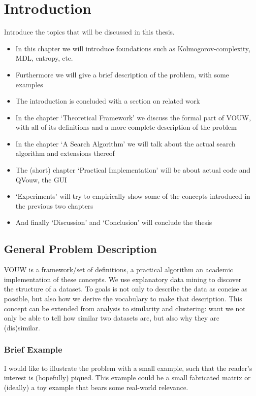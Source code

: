 \documentclass[a4paper,notoc,oneside]{tufte-book}
\begin{document}
\chapter{Introduction}

Introduce the topics that will be discussed in this thesis.
\begin{itemize}
\item In this chapter we will introduce foundations such as Kolmogorov-complexity, MDL, entropy, etc.
\item Furthermore we will give a brief description of the problem, with some examples
\item The introduction is concluded with a section on related work
\item In the chapter `Theoretical Framework' we discuss the formal part of VOUW, with all of its definitions and a more complete description of the problem
\item In the chapter `A Search Algorithm' we will talk about the actual search algorithm and extensions thereof 
\item The (short) chapter `Practical Implementation' will be about actual code and QVouw, the GUI
\item `Experiments' will try to empirically show some of the concepts introduced in the previous two chapters
\item And finally `Discussion' and `Conclusion' will conclude the thesis
\end{itemize}

\section{General Problem Description}

VOUW is a framework/set of definitions, a practical algorithm an academic implementation of these concepts. We use explanatory data mining to discover the structure of a dataset. To goals is not only to describe the data as concise as possible, but also how we derive the vocabulary to make that description. This concept can be extended from analysis to similarity and clustering: want we not only be able to tell how similar two datasets are, but also why they are (dis)similar. 

\subsection{Brief Example}

I would like to illustrate the problem with a small example, such that the reader's interest is (hopefully) piqued. This example could be a small fabricated matrix or (ideally) a toy example that bears some real-world relevance.
\end{document}
